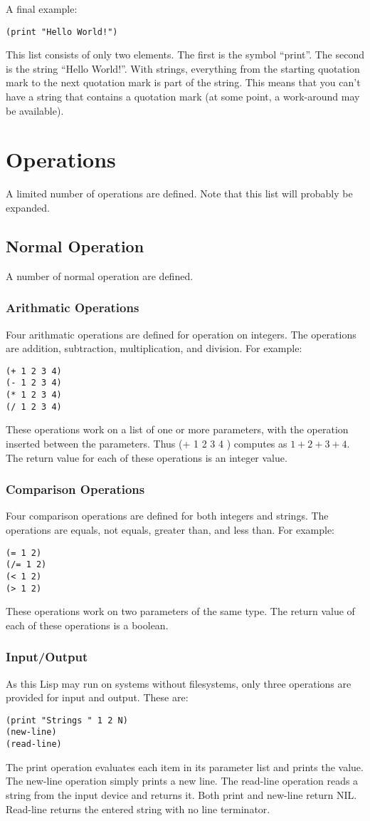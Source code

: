 \documentclass[10pt, openany]{book}
\begin{document}
A final example:
\begin{lstlisting}
(print "Hello World!")
\end{lstlisting}
This list consists of only two elements.  The first is the symbol ``print''.  The second is the string ``Hello World!''.  With strings, everything from the starting quotation mark to the next quotation mark is part of the string.  This means that you can't have a string that contains a quotation mark (at some point, a work-around may be available).

\section{Operations}
A limited number of operations are defined.  Note that this list will probably be expanded.
\subsection{Normal Operation}
A number of normal operation are defined.
\subsubsection{Arithmatic Operations}
Four arithmatic operations are defined for operation on integers.  The operations are addition, subtraction, multiplication, and division.  For example:
\begin{lstlisting}
(+ 1 2 3 4)
(- 1 2 3 4)
(* 1 2 3 4)
(/ 1 2 3 4)
\end{lstlisting}
These operations work on a list of one or more parameters, with the operation inserted between the parameters.  Thus (+ 1 2 3 4 ) computes as $1+2+3+4$.  The return value for each of these operations is an integer value.

\subsubsection{Comparison Operations}
Four comparison operations are defined for both integers and strings.  The operations are equals, not equals, greater than, and less than.  For example:
\begin{lstlisting}
(= 1 2)
(/= 1 2)
(< 1 2)
(> 1 2)
\end{lstlisting}
These operations work on two parameters of the same type.  The return value of each of these operations is a boolean.

\subsubsection{Input/Output}
As this Lisp may run on systems without filesystems, only three operations are provided for input and output.  These are:
\begin{lstlisting}
(print "Strings " 1 2 N)
(new-line)
(read-line)
\end{lstlisting}
The print operation evaluates each item in its parameter list and prints the value.  The new-line operation simply prints a new line.  The read-line operation reads a string from the input device and returns it.  Both print and new-line return NIL.  Read-line returns the entered string with no line terminator.
\end{document}
